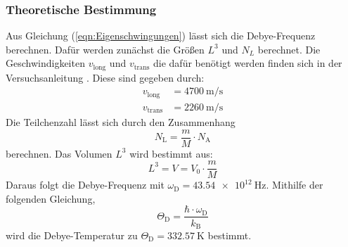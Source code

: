 \subsubsection{Theoretische Bestimmung}
Aus Gleichung (\ref{eqn:Eigenschwingungen}) lässt sich die Debye-Frequenz berechnen.
Dafür werden zunächst die Größen $L^3$ und $N_L$ berechnet.
Die Geschwindigkeiten $v_\mathrm{long}$ und $v_\mathrm{trans}$ die dafür benötigt werden finden sich in der Versuchsanleitung \cite{Anleitung}. Diese sind gegeben durch:
\begin{align*}
  v_\mathrm{long} &= \SI{4700}{\meter\per\second} \\
  v_\mathrm{trans} &= \SI{2260}{\meter\per\second}
\end{align*}
Die Teilchenzahl lässt sich durch den Zusammenhang
\begin{equation}
  N_\mathrm{L} = \dfrac{m}{M} \cdot N_\mathrm{A}
\end{equation}
berechnen.
Das Volumen $L^3$ wird bestimmt aus:
\begin{equation}
  L^3 = V = V_0 \cdot \frac{m}{M}
\end{equation}
Daraus folgt die Debye-Frequenz mit $\omega_\mathrm{D} = \SI{43.54e12}{\hertz}$.
Mithilfe der folgenden Gleichung,
\begin{equation}
  \Theta_\mathrm{D} =\dfrac{\hbar\cdot\omega_\mathrm{D}}{k_\mathrm{B}}
\end{equation}
wird die Debye-Temperatur zu $\Theta_\mathrm{D} = \SI{332.57}{\kelvin}$ bestimmt.
